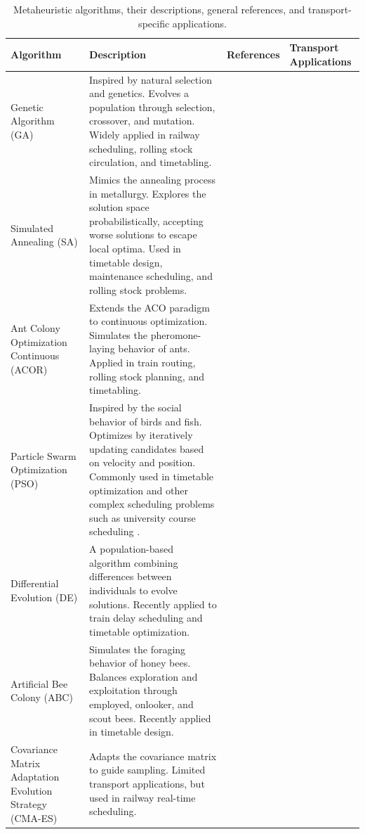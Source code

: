 \documentclass[Afour,sagev,times]{sagej}
\begin{document}
\begin{table}[ht]
\centering
\scriptsize
\caption{Metaheuristic algorithms, their descriptions, general references, and transport-specific applications.}
\begin{tabular}{|>{\centering\arraybackslash}p{2.5cm}|p{7.5cm}|>{\centering\arraybackslash}p{2cm}|>{\centering\arraybackslash}p{2cm}|}
\hline
\textbf{Algorithm} & \textbf{Description} & \textbf{References} & \textbf{Transport Applications} \\ \hline \hline
Genetic Algorithm (GA) & Inspired by natural selection and genetics. Evolves a population through selection, crossover, and mutation. Widely applied in railway scheduling, rolling stock circulation, and timetabling. & \cite{Holland75, Adeli95, Adeli2001} & \cite{Canca18, Pan20, Han21} \\ \hline
Simulated Annealing (SA) & Mimics the annealing process in metallurgy. Explores the solution space probabilistically, accepting worse solutions to escape local optima. Used in timetable design, maintenance scheduling, and rolling stock problems. & \cite{Cerny85, Kirkpatrick85} & \cite{Yue17, Robenek18, Lin19} \\ \hline
Ant Colony Optimization Continuous (ACOR) & Extends the ACO paradigm to continuous optimization. Simulates the pheromone-laying behavior of ants. Applied in train routing, rolling stock planning, and timetabling. & \cite{Dorigo92} & \cite{Tsuji12, Sama16, Coviello23} \\ \hline
Particle Swarm Optimization (PSO) & Inspired by the social behavior of birds and fish. Optimizes by iteratively updating candidates based on velocity and position. Commonly used in timetable optimization and other complex scheduling problems such as university course scheduling \cite{Hossain19}. & \cite{Eberhart95} & \cite{Ho12, Jamili12, Wu16} \\ \hline
Differential Evolution (DE) & A population-based algorithm combining differences between individuals to evolve solutions. Recently applied to train delay scheduling and timetable optimization. & \cite{Storn95, Storn97} & \cite{Zhong13, Song23} \\ \hline
Artificial Bee Colony (ABC) & Simulates the foraging behavior of honey bees. Balances exploration and exploitation through employed, onlooker, and scout bees. Recently applied in timetable design. & \cite{Karaboga05, Karaboga07} & \cite{Chen22, Wang24} \\ \hline
Covariance Matrix Adaptation Evolution Strategy (CMA-ES) & Adapts the covariance matrix to guide sampling. Limited transport applications, but used in railway real-time scheduling. & \cite{Auger11} & \cite{Prasad20} \\ \hline

\end{tabular}
\end{table}
\end{document}
